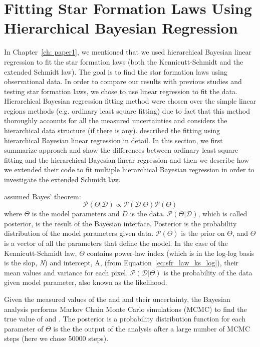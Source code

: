 \chapter{Fitting Star Formation Laws Using Hierarchical Bayesian Regression}
\pagestyle{plain}
\label{app:bays_fitting}
\myappendices

In Chapter~\ref{ch: paper1}, we mentioned that we used hierarchical Bayesian linear regression to fit the star formation laws (both the Kennicutt-Schmidt and the extended Schmidt law).
The goal is to find the star formation laws using observational data.
In order to compare our results with previous studies and testing star formation laws, we chose to use linear regression to fit the data.
Hierarchical Bayesian regression fitting method were chosen over the simple linear regions methods (e.g. ordinary least square fitting) due to fact that this method thoroughly accounts for all the measured uncertainties and considers the hierarchical data structure (if there is any).
\cite{Shetty13} described the fitting using hierarchical Bayesian linear regression in detail.
In this section, we first summarize \cite{Shetty13} approach and show the differences between ordinary least square fitting and the hierarchical Bayesian linear regression and then we describe how we extended their code to fit multiple hierarchical Bayesian regression in order to investigate the extended Schmidt law.

\cite{Shetty13} assumed Bayes' theorem:
\begin{equation}
  \mathcal{P}({\Theta | \mathcal{D}})  \propto \mathcal{P}({\mathcal{D}|\Theta})\mathcal{P}(\Theta)
\end{equation}
where $\Theta$ is the model parameters and $D$ is the data.
$\mathcal{P}({\Theta | \mathcal{D}})$, which is called posterior, is the result of the Bayesian interface.
Posterior is the probability distribution of the model parameters given data. 
$\mathcal{P}(\Theta)$ is the prior on $\Theta$, and $\Theta$ is a vector of all the parameters that define the model.
In the case of the Kennicutt-Schmidt law, $\Theta$ contains power-law index (which is in the log-log basis is the slop,  {\it N}) and intercept, A, (from Equation~\ref{eq:sfr_law_ks_log}), their mean values and variance for each pixel. 
$\mathcal{P}({\mathcal{D}|\Theta})$ is the probability of the data given model parameter, also known as the likelihood.


Given the measured values of the \sigmagas and \sigmasfr and their uncertainty, the Bayesian analysis performs Markov Chain Monte Carlo simulations (MCMC) to find the true value of \sigmagas and \sigmasfr.
The posterior is a probability distribution function for each parameter of $\Theta$ is the the output of the analysis after a large number of MCMC steps (here we chose 50000 steps).

